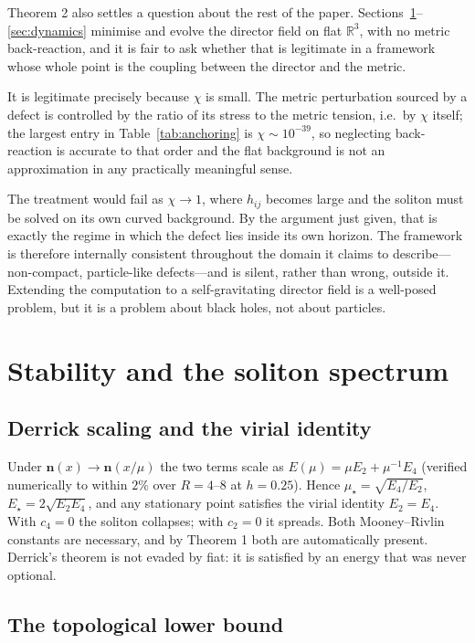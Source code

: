 \documentclass[aps,prd,preprint,nofootinbib,longbibliography]{revtex4-2}
\newcommand{\nv}{\bm{n}}
\begin{document}
Theorem 2 also settles a question about the rest of the paper.
Sections~\ref{sec:spectrum}--\ref{sec:dynamics} minimise and evolve the director
field on flat $\mathbb{R}^3$, with no metric back-reaction, and it is fair to ask
whether that is legitimate in a framework whose whole point is the coupling
between the director and the metric.

It is legitimate precisely because $\chi$ is small. The metric perturbation
sourced by a defect is controlled by the ratio of its stress to the metric
tension, i.e.\ by $\chi$ itself; the largest entry in Table~\ref{tab:anchoring}
is $\chi\sim10^{-39}$, so neglecting back-reaction is accurate to that order and
the flat background is not an approximation in any practically meaningful sense.

The treatment would fail as $\chi\to1$, where $h_{ij}$ becomes large and the
soliton must be solved on its own curved background. By the argument just given,
that is exactly the regime in which the defect lies inside its own horizon. The
framework is therefore internally consistent throughout the domain it claims to
describe---non-compact, particle-like defects---and is silent, rather than wrong,
outside it. Extending the computation to a self-gravitating director field is a
well-posed problem, but it is a problem about black holes, not about particles.

\section{Stability and the soliton spectrum}
\label{sec:spectrum}

\subsection{Derrick scaling and the virial identity}

Under $\nv(x)\to\nv(x/\mu)$ the two terms scale as $E(\mu)=\mu E_2+\mu^{-1}E_4$
(verified numerically to within $2\%$ over $R=4$--$8$ at $h=0.25$). Hence
$\mu_\star=\sqrt{E_4/E_2}$, $E_\star=2\sqrt{E_2E_4}$, and any stationary point
satisfies the virial identity $E_2=E_4$. With $c_4=0$ the soliton collapses; with
$c_2=0$ it spreads. Both Mooney--Rivlin constants are necessary, and by Theorem 1
both are automatically present. Derrick's theorem is not evaded by fiat: it is
satisfied by an energy that was never optional.

\subsection{The topological lower bound}
\end{document}
